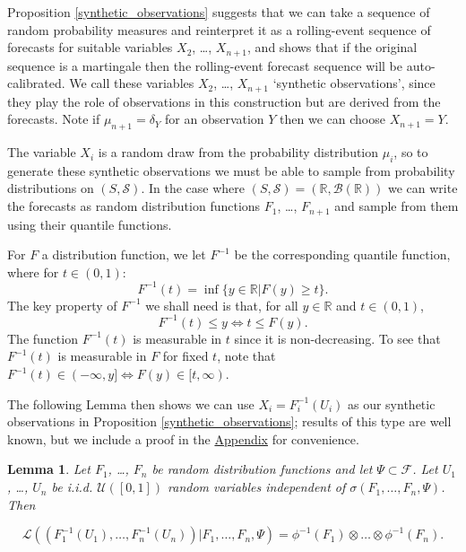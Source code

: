 \documentclass[aap]{imsart}
\theoremstyle{plain}
\newtheorem{lemma}[theorem]{Lemma}
\theoremstyle{definition}
\begin{document}
Proposition \ref{synthetic_observations} suggests that we can take a sequence of random probability measures and reinterpret it as a rolling-event sequence of forecasts for suitable variables $X_2$, \ldots, $X_{n+1}$, and shows that if the original sequence is a martingale then the rolling-event forecast sequence will be auto-calibrated. We call these variables $X_2$, \ldots, $X_{n+1}$ `synthetic observations', since they play the role of observations in this construction but are derived from the forecasts. Note if $\mu_{n+1} = \delta_{Y}$ for an observation $Y$ then we can choose $X_{n+1} = Y$.

The variable $X_i$ is a random draw from the probability distribution $\mu_i$, so to generate these synthetic observations we must be able to sample from probability distributions on $(S, \mathcal{S})$. In the case where $(S, \mathcal{S}) = (\mathbb{R}, \mathcal{B}(\mathbb{R}))$ we can write the forecasts as random distribution functions $F_1$, \ldots, $F_{n+1}$ and sample from them using their quantile functions.

For $F$ a distribution function, we let $F^{-1}$ be the corresponding quantile function, where for $t \in (0,1)$:
\begin{equation*}
  F^{-1}(t) = \inf \{y \in \mathbb{R}|F(y) \geq t\}.
\end{equation*}
The key property of $F^{-1}$ we shall need is that, for all $y \in \mathbb{R}$ and $t \in (0,1)$,
\begin{equation*}
  F^{-1}(t) \leq y \iff t \leq F(y).
\end{equation*}
The function $F^{-1}(t)$ is measurable in $t$ since it is non-decreasing. To see that $F^{-1}(t)$ is measurable in $F$ for fixed $t$, note that $F^{-1}(t) \in (-\infty, y] \iff F(y) \in [t, \infty)$.

The following Lemma then shows we can use $X_i = F_i^{-1}(U_i)$ as our synthetic observations in Proposition \ref{synthetic_observations}; results of this type are well known, but we include a proof in the \hyperref[appn]{Appendix} for convenience.
\begin{lemma}\label{F_inv_U}
  Let $F_1$, \ldots, $F_n$ be random distribution functions and let $\Psi \subset \mathcal{F}$. Let $U_1$, \ldots, $U_n$ be i.i.d. $\mathcal{U}([0,1])$ random variables independent of $\sigma(F_1, \ldots, F_n, \Psi)$. Then

\begin{equation*}
  \mathcal{L}((F_1^{-1}(U_1), \ldots, F_n^{-1}(U_n))|F_1, \ldots, F_n, \Psi) = \phi^{-1}(F_1) \otimes \ldots \otimes \phi^{-1}(F_n).
\end{equation*}
\end{lemma}
\end{document}
